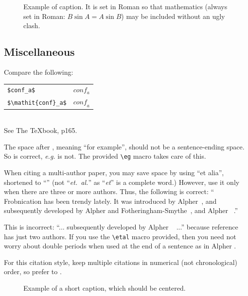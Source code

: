\documentclass[10pt,twocolumn,letterpaper]{article}
\begin{document}
\begin{figure}[t]
\begin{center}
\fbox{\rule{0pt}{2in} \rule{0.9\linewidth}{0pt}}
\end{center}
   \caption{Example of caption.  It is set in Roman so that mathematics
   (always set in Roman: $B \sin A = A \sin B$) may be included without an
   ugly clash.}
\label{fig:long}
\label{fig:onecol}
\end{figure}

\subsection{Miscellaneous}

\noindent
Compare the following:\\
\begin{tabular}{ll}
 \verb'$conf_a$' &  $conf_a$ \\
 \verb'$\mathit{conf}_a$' & $\mathit{conf}_a$
\end{tabular}\\
See The \TeX book, p165.

The space after \eg, meaning ``for example'', should not be a
sentence-ending space. So \eg is correct, {\em e.g.} is not.  The provided
\verb'\eg' macro takes care of this.

When citing a multi-author paper, you may save space by using ``et alia'',
shortened to ``\etal'' (not ``{\em et.\ al.}'' as ``{\em et}'' is a complete word.)
However, use it only when there are three or more authors.  Thus, the
following is correct: ``
   Frobnication has been trendy lately.
   It was introduced by Alpher~\cite{Alpher02}, and subsequently developed by
   Alpher and Fotheringham-Smythe~\cite{Alpher03}, and Alpher \etal~\cite{Alpher04}.''

This is incorrect: ``... subsequently developed by Alpher \etal~\cite{Alpher03} ...''
because reference~\cite{Alpher03} has just two authors.  If you use the
\verb'\etal' macro provided, then you need not worry about double periods
when used at the end of a sentence as in Alpher \etal.

For this citation style, keep multiple citations in numerical (not
chronological) order, so prefer \cite{Alpher03,Alpher02,Authors14} to
\cite{Alpher02,Alpher03,Authors14}.


\begin{figure}
\begin{center}
\fbox{\rule{0pt}{2in} \rule{.9\linewidth}{0pt}}
\end{center}
   \caption{Example of a short caption, which should be centered.}
\label{fig:short}
\end{figure}
\end{document}
